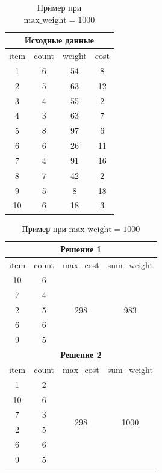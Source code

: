 \documentclass[12pt, a4paper]{article}
\begin{document}
	\begin{table}[H]
		\small
		\centering		
		\caption{Пример при $\textrm{max\_weight}=1000$}\medskip	
		\begin{tabular}{|c|c|c|c|}
			\hline
			\multicolumn{4}{|c|}{\textbf{Исходные данные}}\\
			\hline
			\rowcolor{Gray}
			item & count & weight & cost \\
			\hline
			1 & 6 & 54 & 8 \\
			\hline
			2 & 5 & 63 & 12 \\
			\hline
			3 & 4 & 55 & 2 \\
			\hline
			4 & 3 & 63 & 7 \\
			\hline
			5 & 8 & 97 & 6 \\
			\hline
			6 & 6 & 26 & 11\\
			\hline
			7 & 4 & 91 & 16\\
			\hline
			8 & 7 & 42 & 2\\
			\hline
			9 & 5 & 8 & 18\\
			\hline
			10 & 6 & 18 & 3\\
			\hline
		\end{tabular}
		\;
		\begin{tabular}{|c|c|c|c|}
			\hline
			\multicolumn{4}{|c|}{\textbf{Решение 1}}\\
			\hline
			\rowcolor{Gray}
			item & count & max\_cost & sum\_weight \\
			\hline
			10 & 6 &  \multirow{5}{*}{\large 298} & \multirow{5}{*}{\large 983}  \\
			\cline{1-2}
			7 & 4 &  &  \\
			\cline{1-2}
			2 & 5 &  &  \\
			\cline{1-2}
			6 & 6 &  &  \\
			\cline{1-2}
			9 & 5 &  &  \\
			\hline
			\multicolumn{4}{|c|}{\textbf{Решение 2}}\\
			\hline
			\rowcolor{Gray}
			item & count & max\_cost & sum\_weight \\
			\hline
			1 & 2 &  \multirow{6}{*}{\large 298} & \multirow{6}{*}{\large 1000}  \\
			\cline{1-2}
			10 & 6 &  &  \\
			\cline{1-2}
			7 & 3 &  &  \\
			\cline{1-2}
			2 & 5 &  &  \\
			\cline{1-2}
			6 & 6 &  &  \\
			\cline{1-2}
			9 & 5 &  &  \\
			\hline
		\end{tabular}
		\label{tab:example3}
	\end{table}	
\end{document}
